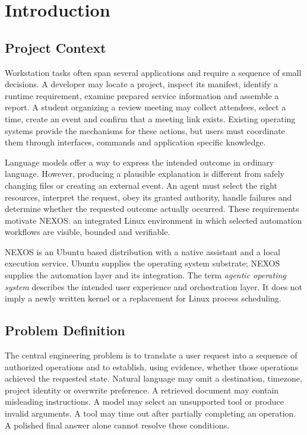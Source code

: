 \chapter{Introduction}
\section{Project Context}
Workstation tasks often span several applications and require a sequence of small decisions. A developer may locate a project, inspect its manifest, identify a runtime requirement, examine prepared service information and assemble a report. A student organizing a review meeting may collect attendees, select a time, create an event and confirm that a meeting link exists. Existing operating systems provide the mechanisms for these actions, but users must coordinate them through interfaces, commands and application specific knowledge.

Language models offer a way to express the intended outcome in ordinary language. However, producing a plausible explanation is different from safely changing files or creating an external event. An agent must select the right resources, interpret the request, obey its granted authority, handle failures and determine whether the requested outcome actually occurred. These requirements motivate NEXOS: an integrated Linux environment in which selected automation workflows are visible, bounded and verifiable.

NEXOS is an Ubuntu based distribution with a native assistant and a local execution service. Ubuntu supplies the operating system substrate; NEXOS supplies the automation layer and its integration. The term \emph{agentic operating system} describes the intended user experience and orchestration layer. It does not imply a newly written kernel or a replacement for Linux process scheduling.

\section{Problem Definition}
The central engineering problem is to translate a user request into a sequence of authorized operations and to establish, using evidence, whether those operations achieved the requested state. Natural language may omit a destination, timezone, project identity or overwrite preference. A retrieved document may contain misleading instructions. A model may select an unsupported tool or produce invalid arguments. A tool may time out after partially completing an operation. A polished final answer alone cannot resolve these conditions.

